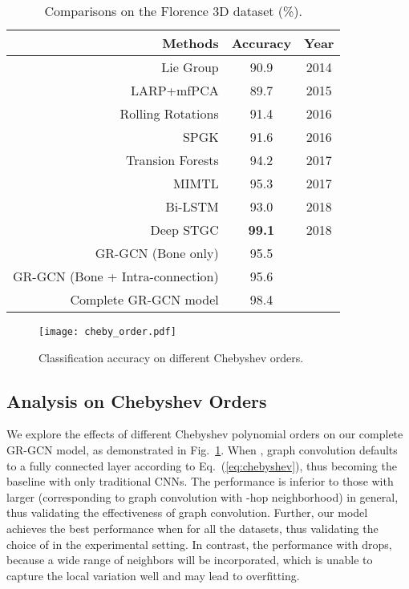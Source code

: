 \documentclass[conference]{IEEEtran}
\begin{document}
\begin{table}
  \centering
  \caption{Comparisons on the Florence 3D dataset (\%).}
  \label{tb:florence}
  \begin{tabular}{rcc}
    \hline
     \textbf{Methods} & \textbf{Accuracy} & \textbf{Year} \\
    \hline
    Lie Group \cite{vemulapalli14} & 90.9 & 2014 \\
    LARP+mfPCA \cite{Rushil_2015_CVPR} & 89.7 & 2015 \\
    Rolling Rotations \cite{Raviteja_2016_CVPR} & 91.4 & 2016 \\
    SPGK \cite{Wang16eccv} & 91.6 & 2016 \\
    Transion Forests \cite{Guillermo_2017_CVPR} & 94.2 & 2017 \\
    MIMTL \cite{yang2017} & 95.3 & 2017 \\
    Bi-LSTM \cite{Tanfous_CVPR_2018} & 93.0 & 2018 \\
    Deep STGC \cite{li18spatio}  & \textbf{99.1} & 2018 \\
    \hline
    GR-GCN (Bone only) & 95.5 &  \\
    GR-GCN (Bone + Intra-connection) & 95.6 & \\
    Complete GR-GCN model & 98.4 & \\
    \hline
  \end{tabular}
\end{table}

\begin{figure}[htbp]
    \centering
    \texttt{[image: cheby\_order.pdf]}
    \caption{Classification accuracy on different Chebyshev orders.}
    \label{fig:cheby_order}
\end{figure}

\subsection{Analysis on Chebyshev Orders}

We explore the effects of different Chebyshev polynomial orders on our complete GR-GCN model, as demonstrated in Fig.~\ref{fig:cheby_order}.
When , graph convolution defaults to a fully connected layer according to Eq.~(\ref{eq:chebyshev}), thus becoming the baseline with only traditional CNNs. The performance is inferior to those with larger  (corresponding to graph convolution with -hop neighborhood) in general, thus validating the effectiveness of graph convolution. Further, our model achieves the best performance when   for all the datasets, thus validating the choice of  in the experimental setting. In contrast, the performance with  drops, because a wide range of neighbors will be incorporated, which is unable to capture the local variation well and may lead to overfitting.
\end{document}
